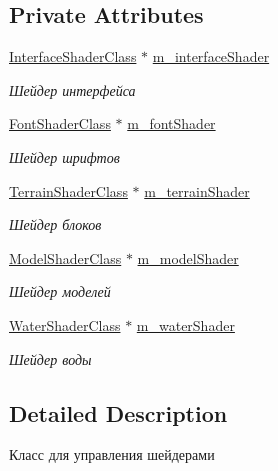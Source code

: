 \subsection*{Private Attributes}
\begin{DoxyCompactItemize}
\item 
\hyperlink{class_interface_shader_class}{Interface\+Shader\+Class} $\ast$ \hyperlink{class_shader_manager_class_a8c98e4ff13e14267426cd15686074fb2}{m\+\_\+interface\+Shader}
\begin{DoxyCompactList}\small\item\em Шейдер интерфейса \end{DoxyCompactList}\item 
\hyperlink{class_font_shader_class}{Font\+Shader\+Class} $\ast$ \hyperlink{class_shader_manager_class_aebdae8a29f38b27ce1055ba52b6f84dd}{m\+\_\+font\+Shader}
\begin{DoxyCompactList}\small\item\em Шейдер шрифтов \end{DoxyCompactList}\item 
\hyperlink{class_terrain_shader_class}{Terrain\+Shader\+Class} $\ast$ \hyperlink{class_shader_manager_class_a481cf6bc2479b88e36e33d71b65ffc98}{m\+\_\+terrain\+Shader}
\begin{DoxyCompactList}\small\item\em Шейдер блоков \end{DoxyCompactList}\item 
\hyperlink{class_model_shader_class}{Model\+Shader\+Class} $\ast$ \hyperlink{class_shader_manager_class_ad72f3b6e59577e81e00aac9a4424d997}{m\+\_\+model\+Shader}
\begin{DoxyCompactList}\small\item\em Шейдер моделей \end{DoxyCompactList}\item 
\hyperlink{class_water_shader_class}{Water\+Shader\+Class} $\ast$ \hyperlink{class_shader_manager_class_aee012818f0b1fd4c4251cc4c240c074c}{m\+\_\+water\+Shader}
\begin{DoxyCompactList}\small\item\em Шейдер воды \end{DoxyCompactList}\end{DoxyCompactItemize}


\subsection{Detailed Description}
Класс для управления шейдерами 

